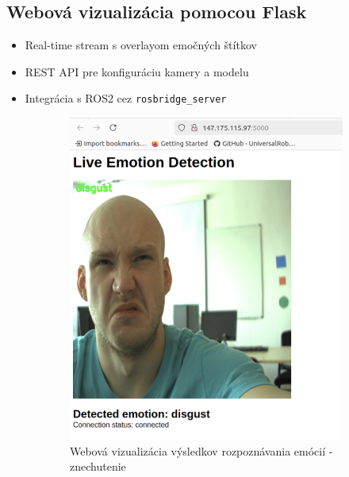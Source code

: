 \subsection{Webová vizualizácia pomocou Flask}
\begin{itemize}
\item Real-time stream s overlayom emočných štítkov
\item REST API pre konfiguráciu kamery a modelu
\item Integrácia s ROS2 cez \texttt{rosbridge\_server}
\end{itemize}

\begin{figure}[!htpb]
    \centering
    \begin{subfigure}{0.48\textwidth}
        \includegraphics[width=\textwidth]{img/web_1.png}
        \caption{Webová vizualizácia výsledkov rozpoznávania emócií - znechutenie}
    \end{subfigure}
    \hfill
    \begin{subfigure}{0.48\textwidth}

\end{subfigure}
\end{figure}
